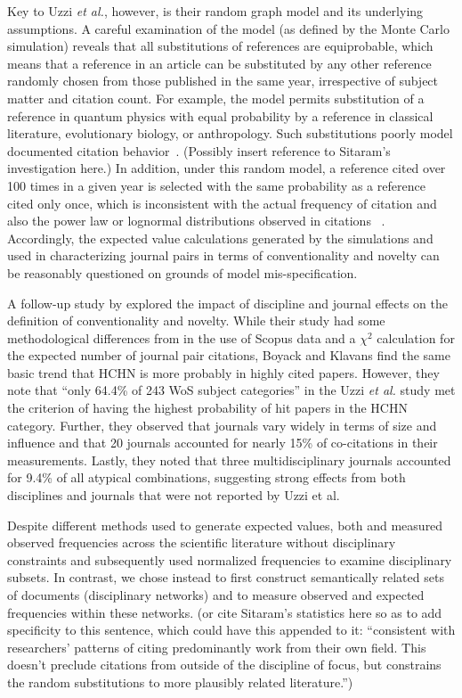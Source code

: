 \documentclass[NETN]{stjour}
\begin{document}
Key to Uzzi {\em et al.}, however, is their random graph model and its underlying assumptions. A careful examination of the model (as defined by the Monte Carlo simulation) reveals that all substitutions of references are equiprobable, which means that a reference in an article can be substituted by any other reference randomly chosen from those published in the same year, irrespective of subject matter and citation count. For example, the model permits substitution of a reference in quantum physics with equal probability by a reference in classical literature, evolutionary biology, or anthropology. Such substitutions poorly model documented citation behavior~\citep{wallace_lariviere_gingras_2012,moed_measuring_2010,klavans_research_2017,garfield_1979}. (Possibly insert reference to Sitaram's investigation here.) In addition, under this random model,  a reference cited over 100 times in a given year is selected with the same probability as a reference cited only once, which is inconsistent with the actual frequency of citation and also the power law or lognormal distributions observed in citations ~\citep{stringer_statistical_2010,perline_strong_2005}.  Accordingly, the expected value calculations generated by the \citep{uzzi_atypical_2013} simulations and used in characterizing journal pairs in terms of conventionality and novelty  can be reasonably questioned on grounds of model mis-specification. 

A follow-up study by \citep{boyack_vs_uzzi_2014} explored the impact of discipline and journal effects on the definition of conventionality and novelty.  While their study had some methodological differences from \citep{uzzi_atypical_2013} in the use of Scopus data and a $\chi^2$ calculation for the expected number of journal pair citations, Boyack and Klavans find the same basic trend that HCHN is more probably in highly cited papers. However, they note that ``only 64.4\%  of  243  WoS  subject  categories'' in the Uzzi {\em et al.} study met the criterion of having the highest probability of hit papers in the HCHN category.  Further, they observed that journals vary widely in terms of size and influence and that 20 journals accounted for nearly 15\% of co-citations in their measurements. Lastly, they noted that three multidisciplinary journals accounted for 9.4\% of all atypical combinations, suggesting strong effects from both disciplines and journals that were not reported by Uzzi et al. 

Despite different methods used to generate expected values, both \citep{uzzi_atypical_2013} and \citep{boyack_vs_uzzi_2014}  measured observed frequencies across the scientific literature without disciplinary constraints and subsequently used normalized frequencies to examine disciplinary subsets. In contrast, we chose instead to first construct semantically related sets of documents (disciplinary networks) and to measure observed and expected frequencies within these networks. (or cite Sitaram's statistics here so as to add specificity to this sentence, which could have this appended to it: ``consistent with researchers' patterns of citing predominantly work from their own field.  This doesn't preclude citations from outside of the discipline of focus, but constrains the random substitutions to more plausibly related literature.'')
\end{document}
